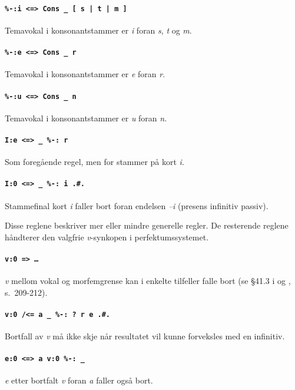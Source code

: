 \documentclass{article}
\newcommand\w[1]{\emph{#1}}
\begin{document}
\paragraph{\texttt{\%-:i <=> Cons \_ [ s | t | m ]}} Temavokal i
konsonantstammer er \w{i} foran \w{s}, \w{t} og \w{m}.

\paragraph{\texttt{\%-:e <=> Cons \_ r}} Temavokal i konsonantstammer er
\w{e} foran \w{r}.

\paragraph{\texttt{\%-:u <=> Cons \_ n}} Temavokal i konsonantstammer er
\w{u} foran \w{n}.

\paragraph{\texttt{I:e <=> \_ \%-: r}} Som foreg\aa{}ende regel, men for
stammer p\aa{} kort \w{i}.

\paragraph{\texttt{I:0 <=> \_ \%-: i .\#.}} Stammefinal kort \w{i} faller bort
foran endelsen \w{--i} (presens infinitiv passiv).

Disse reglene beskriver mer eller mindre generelle regler. De resterende
reglene h\aa{}ndterer den valgfrie \w{v}-synkopen i perfektumssystemet.

\paragraph{\texttt{v:0 => \ldots}} \w{v} mellom vokal og morfemgrense kan i
enkelte tilfeller falle bort (se \S 41.3 i  og ,
s.~209-212).

\paragraph{\texttt{v:0 /<= a \_ \%-: ? r e .\#.}} Bortfall av \w{v} m\aa{}
ikke skje n\aa{}r resultatet vil kunne forveksles med en infinitiv.

\paragraph{\texttt{e:0 <=> a v:0 \%-: \_}} \w{e} etter bortfalt \w{v} foran
\w{a} faller ogs\aa{} bort.
\end{document}
